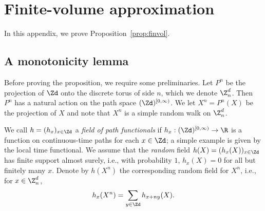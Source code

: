 \chapter{Finite-volume approximation}
\label{sec:finvol}

In this appendix, we prove Proposition~\ref{prop:finvol}.







\section{A monotonicity lemma}

Before proving the proposition, we require some preliminaries.
Let $P^n$ be the projection
of $\Zd$ onto the discrete torus of side $n$,
which we denote $\Z_n^d$.
Then $P^n$ has a natural action
on the path space $(\Zd)^{[0,\infty)}$. We let
$X^n = P^n(X)$ be the projection of $X$
and note that $X^n$ is a simple random walk on $\Z^d_n$.

We call $h = (h_x)_{x\in\Zd}$ a \emph{field of path functionals} if
$h_x : (\Zd)^{[0,\infty)} \to \R$ is a function on continuous-time paths
for each $x \in \Zd$;
a simple example is given by the local time functional.
We assume that the \emph{random} field $h(X) = (h_x(X))_{x\in\Zd}$
has finite support almost surely, i.e.,
with probability $1$, $h_x(X) = 0$ for all but finitely many $x$.
Denote by $h(X^n)$ the corresponding random field for $X^n$, i.e., for $x \in \Z_n^d$,
\begin{equation}
h_x(X^n) = \sum_{y\in\Zd} h_{x+ny}(X).
\end{equation}

